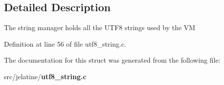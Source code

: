\subsection{Detailed Description}
The string manager holds all the UTF8 strings used by the VM 

Definition at line 56 of file utf8\_\-string.c.



The documentation for this struct was generated from the following file:\begin{DoxyCompactItemize}
\item 
src/jelatine/{\bf utf8\_\-string.c}\end{DoxyCompactItemize}
